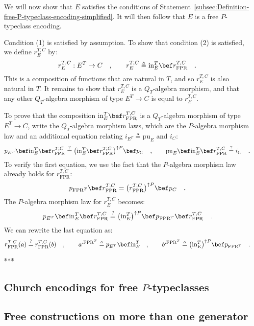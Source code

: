 We will now show that $E$ satisfies the conditions of Statement~\ref{subsec:Definition-free-P-typeclass-encoding-simplified}.
It will then follow that $E$ is a free $P$-typeclass encoding. 

Condition (1) is satisfied by assumption. To show that condition (2)
is satisfied, we define $r_{E}^{T,C}$ by:
\[
r_{E}^{T,C}:E^{T}\rightarrow C\quad,\quad\quad r_{E}^{T,C}\triangleq\text{in}_{E}^{T}\bef r_{\text{FPR}}^{T,C}\quad.
\]
This is a composition of functions that are natural in $T$, and so
$r_{E}^{T,C}$ is also natural in $T$. It remains to show that $r_{E}^{T,C}$
is a $Q_{T}$-algebra morphism, and that any other $Q_{T}$-algebra
morphism of type $E^{T}\rightarrow C$ is equal to $r_{E}^{T,C}$.

To prove that the composition $\text{in}_{E}^{T}\bef r_{\text{FPR}}^{T,C}$
is a $Q_{T}$-algebra morphism of type $E^{T}\rightarrow C$, write
the $Q_{T}$-algebra morphism laws, which are the $P$-algebra morphism
law and an additional equation relating $i_{E^{T}}\triangleq\text{pu}_{E}$
and $i_{C}$: 
\[
p_{E^{T}}\bef\text{in}_{E}^{T}\bef r_{\text{FPR}}^{T,C}\overset{?}{=}\big(\text{in}_{E}^{T}\bef r_{\text{FPR}}^{T,C}\big)^{\uparrow P}\bef p_{C}\quad,\quad\quad\text{pu}_{E}\bef\text{in}_{E}^{T}\bef r_{\text{FPR}}^{T,C}\overset{?}{=}i_{C}\quad.
\]
To verify the first equation, we use the fact that the $P$-algebra
morphism law already holds for $r_{\text{FPR}}^{T,C}$:
\[
p_{\text{FPR}^{T}}\bef r_{\text{FPR}}^{T,C}=\big(r_{\text{FPR}}^{T,C}\big)^{\uparrow P}\bef p_{C}\quad.
\]
The $P$-algebra morphism law for $r_{E}^{T,C}$ becomes:
\[
p_{E^{T}}\bef\text{in}_{E}^{T}\bef r_{\text{FPR}}^{T,C}\overset{?}{=}\big(\text{in}_{E}^{T}\big)^{\uparrow P}\bef p_{\text{FPR}^{T}}\bef r_{\text{FPR}}^{T,C}\quad.
\]
We can rewrite the last equation as: 
\[
r_{\text{FPR}}^{T,C}(a)\overset{?}{=}r_{\text{FPR}}^{T,C}(b)\quad,\quad\quad a^{:\text{FPR}^{T}}\triangleq p_{E^{T}}\bef\text{in}_{E}^{T}\quad,\quad\quad b^{:\text{FPR}^{T}}\triangleq\big(\text{in}_{E}^{T}\big)^{\uparrow P}\bef p_{\text{FPR}^{T}}\quad.
\]

{*}{*}{*}

\subsection{Church encodings for free $P$-typeclasses\label{subsec:Church-encodings-for-free-P-typeclasses}}

\subsection{Free constructions on more than one generator}

